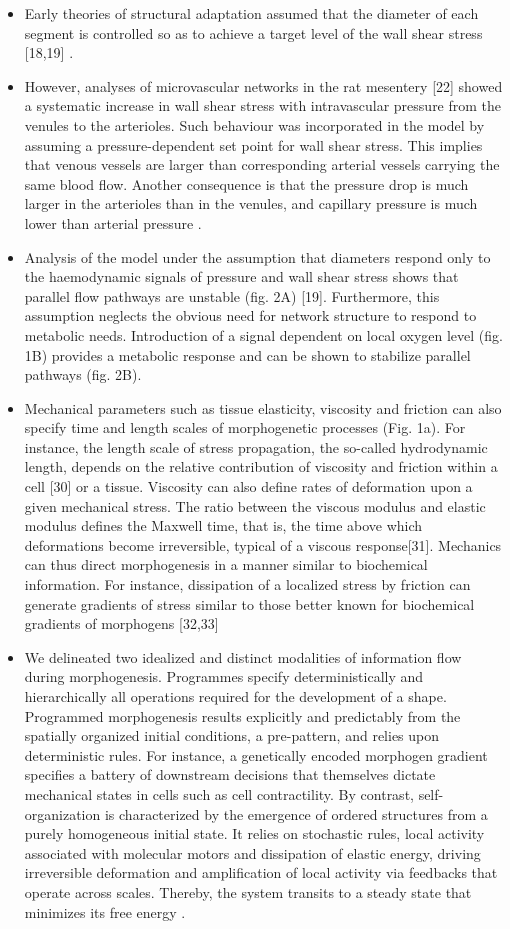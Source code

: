 \begin{itemize}
	\item Early theories of structural adaptation assumed that the diameter of each segment is controlled so as to achieve a target level of the wall shear stress [18,19] \cite{Secomb2012}.
	\item However, analyses of microvascular networks in the rat mesentery [22] showed a systematic increase in wall shear stress with intravascular pressure from the venules to the arterioles. Such behaviour was incorporated in the model by assuming a pressure-dependent set point for wall shear stress. This implies that venous vessels are larger than corresponding arterial vessels carrying the same blood flow. Another consequence is that the pressure drop is much larger in the arterioles than in the venules, and capillary pressure is much lower than arterial pressure \cite{Secomb2012}.
	\item Analysis of the model under the assumption that diameters respond only to the haemodynamic signals of pressure and wall shear stress shows that parallel flow pathways are unstable (fig. 2A) [19]. Furthermore, this assumption neglects the obvious need for network structure to respond to metabolic needs. Introduction of a signal dependent on local oxygen level (fig. 1B) provides a metabolic response and can be shown to stabilize parallel pathways (fig. 2B). \cite{Secomb2012}
	\item Mechanical parameters such as tissue elasticity, viscosity and friction can also specify time and length scales of morphogenetic processes (Fig. 1a). For instance, the length scale of stress propagation, the so-called hydrodynamic length, depends on the relative contribution of viscosity and friction within a cell [30] or a tissue. Viscosity can also define rates of deformation upon a given mechanical stress. The ratio between the viscous modulus and elastic modulus defines the Maxwell time, that is, the time above which deformations become irreversible, typical of a viscous response[31]. Mechanics can thus direct morphogenesis in a manner similar to biochemical information. For instance, dissipation of a localized stress by friction can generate gradients of stress similar to those better known for biochemical gradients of morphogens [32,33] \cite{Collinet2021}
	\item We delineated two idealized and distinct modalities of information flow during morphogenesis. Programmes specify deterministically and hierarchically all operations required for the development of a shape. Programmed morphogenesis results explicitly and predictably from the spatially organized initial conditions, a pre-pattern, and relies upon deterministic rules. For instance, a genetically encoded morphogen gradient specifies a battery of downstream decisions that themselves dictate mechanical states in cells such as cell contractility. By contrast, self-organization is characterized by the emergence of ordered structures from a purely homogeneous initial state. It relies on stochastic rules, local activity associated with molecular motors and dissipation of elastic energy, driving irreversible deformation and amplification of local activity via feedbacks that operate across scales. Thereby, the system transits to a steady state that minimizes its free energy \cite{Collinet2021}.

\end{itemize}
